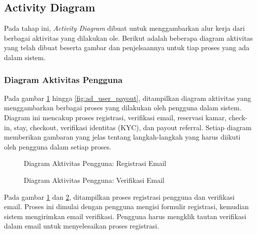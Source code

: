 \subsection{Activity Diagram}

Pada tahap ini, \textit{Activity Diagram} dibuat untuk menggambarkan alur kerja dari berbagai aktivitas yang dilakukan ole. Berikut adalah beberapa diagram aktivitas yang telah dibuat beserta gambar dan penjelsaannya untuk tiap proses yang ada dalam sistem.

\subsubsection{Diagram Aktivitas Pengguna}

Pada gambar \ref{fig:ad_user_registration} hingga \ref{fig:ad_user_payout}, ditampilkan diagram aktivitas yang menggambarkan berbagai proses yang dilakukan oleh pengguna dalam sistem. Diagram ini mencakup proses registrasi, verifikasi email, reservasi kamar, check-in, stay, checkout, verifikasi identitas (KYC), dan payout referral. Setiap diagram memberikan gambaran yang jelas tentang langkah-langkah yang harus diikuti oleh pengguna dalam setiap proses.

\begin{figure}[H] %
    \centering
    \caption{Diagram Aktivitas Pengguna: Registrasi Email}
    \label{fig:ad_user_registration} %
\end{figure}

\begin{figure}[H] %
    \centering
    \caption{Diagram Aktivitas Pengguna: Verifikasi Email}
    \label{fig:ad_user_email_verif} %
\end{figure}

Pada gambar \ref{fig:ad_user_registration} dan \ref{fig:ad_user_email_verif}, ditampilkan proses registrasi pengguna dan verifikasi email. Proses ini dimulai dengan pengguna mengisi formulir registrasi, kemudian sistem mengirimkan email verifikasi. Pengguna harus mengklik tautan verifikasi dalam email untuk menyelesaikan proses registrasi.

